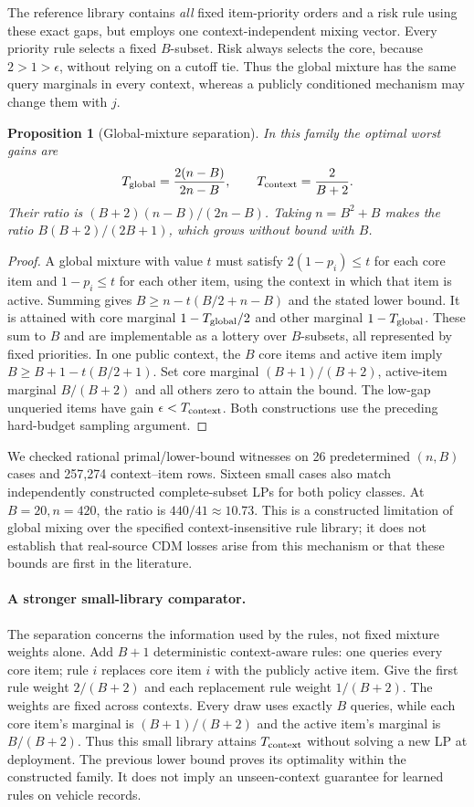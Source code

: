 \documentclass[11pt]{article}
\newtheorem{proposition}{Proposition}
\begin{document}
The reference library contains \emph{all} fixed item-priority orders and a risk
rule using these exact gaps, but employs one context-independent mixing vector.
Every priority rule selects a fixed $B$-subset. Risk always selects the core,
because $2>1>\epsilon$, without relying on a cutoff tie. Thus the global mixture
has the same query marginals in every context, whereas a publicly conditioned
mechanism may change them with $j$.

\begin{proposition}[Global-mixture separation]
In this family the optimal worst gains are
\[
 T_{\rm global}=\frac{2(n-B)}{2n-B},\qquad
 T_{\rm context}=\frac{2}{B+2}.
\]
Their ratio is $(B+2)(n-B)/(2n-B)$. Taking $n=B^2+B$ makes the ratio
$B(B+2)/(2B+1)$, which grows without bound with $B$.
\end{proposition}
\begin{proof}
A global mixture with value $t$ must satisfy $2(1-p_i)\le t$ for each core
item and $1-p_i\le t$ for each other item, using the context in which that
item is active. Summing gives $B\ge n-t(B/2+n-B)$ and the stated lower bound.
It is attained with core marginal $1-T_{\rm global}/2$ and other marginal
$1-T_{\rm global}$. These sum to $B$ and are implementable as a lottery over
$B$-subsets, all represented by fixed priorities. In one public context, the
$B$ core items and active item imply $B\ge B+1-t(B/2+1)$. Set core marginal
$(B+1)/(B+2)$, active-item marginal $B/(B+2)$ and all others zero to attain the
bound. The low-gap unqueried items have gain $\epsilon<T_{\rm context}$.
Both constructions use the preceding hard-budget sampling argument.
\end{proof}

We checked rational primal/lower-bound witnesses on 26 predetermined $(n,B)$
cases and 257,274 context--item rows. Sixteen small cases also match independently
constructed complete-subset LPs for both policy classes. At $B=20,n=420$, the
ratio is $440/41\approx10.73$. This is a constructed limitation of global mixing over the specified
context-insensitive rule library; it does not establish that real-source
CDM losses arise from this mechanism or that these bounds are first in the literature.

\paragraph{A stronger small-library comparator.}
The separation concerns the information used by the rules, not fixed mixture
weights alone. Add $B+1$ deterministic context-aware rules: one queries every
core item; rule $i$ replaces core item $i$ with the publicly active item.
Give the first rule weight $2/(B+2)$ and each replacement rule weight $1/(B+2)$.
The weights are fixed across contexts. Every draw uses exactly $B$ queries,
while each core item's marginal is $(B+1)/(B+2)$ and the active item's marginal
is $B/(B+2)$. Thus this small library attains $T_{\rm context}$ without solving
a new LP at deployment. The previous lower bound proves its optimality within
the constructed family. It does not imply an unseen-context guarantee for
learned rules on vehicle records.
\end{document}
